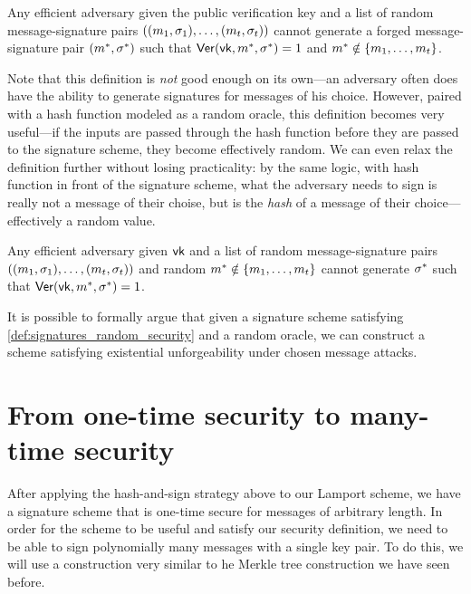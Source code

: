 \begin{definition}
Any efficient adversary given the public verification key and a list of random message-signature pairs $((m_1, \sigma_1), \ldots, (m_t, \sigma_t))$ cannot generate a forged
message-signature pair $(m^*, \sigma^*)$ 
such that $\mathsf{Ver}(\mathsf{vk}, m^*, \sigma^*) = 1$ and $m^* \notin \left\{ m_1, \ldots, m_t \right\}$.
\iffalse
For all efficient adversaries $\calA$:
  \[\Pr\left[ \Ver(\vk, m^*, \sig^*) = 1 \colon 
\begin{aligned}
  (\sk, \vk) &\gets \Gen()\\
  m_i &\getsr \calM \text{, for $i \in \{1, \dots, t\}$}\\
  \sig_i &\gets \Sign(\sk, m_i) \text{, for $i \in \{1, \dots, t\}$}\\
  (m^*, \sigma^*) &\gets \calA\big((m_1, \sig_1), \dots, (m_t, \sig_t) \big)
\end{aligned} \right] \]
\fi
\end{definition}

Note that this definition is \emph{not} good enough on its own---an adversary often does have the ability to generate signatures for messages of his choice. However, paired with a hash function modeled as a random oracle, this definition becomes very useful---if the inputs are passed through the hash function before they are passed to the signature scheme, they become effectively random. We can even relax the definition further without losing practicality: by the same logic, with hash function in front of the signature scheme, what the adversary needs to sign is really not a message of their choise, but is the \emph{hash} of a message of their choice---effectively a random value.

\begin{definition} \label{def:signatures_random_security}
	Any efficient adversary given $\mathsf{vk}$ and a list of random message-signature pairs $((m_1, \sigma_1), \ldots, (m_t, \sigma_t))$ and random $m^* \notin \left\{ m_1, \ldots, m_t \right\}$ cannot generate $\sigma^*$ such that $\mathsf{Ver}(\mathsf{vk}, m^*, \sigma^*) = 1$.
\end{definition}

It is possible to formally argue that given a signature scheme satisfying \cref{def:signatures_random_security} and a random oracle, we can construct a scheme satisfying existential unforgeability under chosen message attacks.

\section{From one-time security to many-time security}
\label{sec:sig:manytime}
After applying the hash-and-sign strategy above to our Lamport scheme, we have a signature scheme that is one-time secure for messages of arbitrary length. In order for the scheme to be useful and satisfy our security definition, we need to be able to sign polynomially many messages with a single key pair. To do this, we will use a construction very similar to he Merkle tree construction we have seen before.

